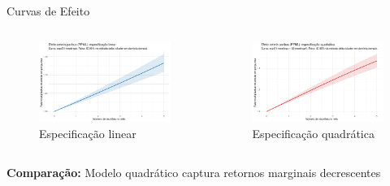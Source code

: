 \documentclass[aspectratio=169]{beamer}
\begin{document}
\begin{frame}{Curvas de Efeito}
\begin{columns}
\begin{column}{0.5\textwidth}
\begin{figure}
\centering
\includegraphics[width=\textwidth]{figures/fig8_effect_linear_ppml.pdf}
\caption{Especificação linear}
\end{figure}
\end{column}
\begin{column}{0.5\textwidth}
\begin{figure}
\centering
\includegraphics[width=\textwidth]{figures/fig9_effect_quadratic_ppml.pdf}
\caption{Especificação quadrática}
\end{figure}
\end{column}
\end{columns}

\textbf{Comparação:} Modelo quadrático captura retornos marginais decrescentes
\end{frame}
\end{document}
